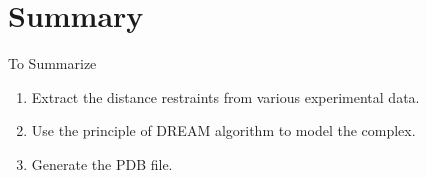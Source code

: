 \section*{Summary}

\begin{frame}{To Summarize}
    
    \begin{enumerate}
        \item Extract the distance restraints from various experimental data.
        \item Use the principle of DREAM algorithm to model the complex.
        \item Generate the PDB file.
    \end{enumerate}

\end{frame}